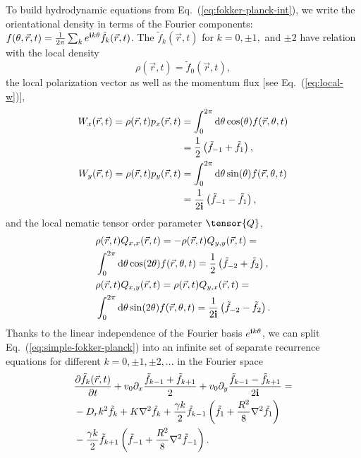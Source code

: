 \documentclass[reprint,floatfix,amsmath,amssymb,aps,pre,showkeys,showpacs,superscriptaddress]{revtex4-1}
\newcommand{\Dif}[2]{\frac{\partial #1}{\partial #2}}
\newcommand{\p}{p}
\newcommand{\im}{{\rm \bf i}}
\newcommand{\w}{W}
\newcommand{\dd}{{\rm d}}
\newcommand{\req}[1]{Eq.~(\ref{#1})}
\begin{document}
To build hydrodynamic equations from \req{eq:fokker-planck-int}, we write the orientational density in terms of the Fourier components: $f(\theta,\vec{r},t) = \frac{1}{2\pi} \sum_k e^{\im k\theta} \tilde{f}_k(\vec{r},t)$. The $\tilde{f}_k(\vec{r},t)$ for $k=0,\pm 1,$ and $\pm 2$ have relation with the local density 
\begin{equation}
\rho(\vec{r},t) = \tilde{f}_0(\vec{r},t),
\label{eq:f0}
\end{equation}
the local polarization vector as well as the momentum flux [see \req{eq:local-w}],
\begin{equation}
\begin{aligned}
\w_x(\vec{r},t) = \rho(\vec{r},t) \p_x(\vec{r},t) &= \int_0^{2\pi} \dd \theta \cos(\theta) f(\vec{r},\theta,t) \\ &= \frac{1}{2} \left( \tilde{f}_{-1} + \tilde{f}_{1} \right),\\
\w_y(\vec{r},t) = \rho(\vec{r},t) \p_y(\vec{r},t) &= \int_0^{2\pi} \dd \theta \sin(\theta) f(\vec{r},\theta,t) \\&= \frac{1}{2 \im} \left( \tilde{f}_{-1} - \tilde{f}_{1} \right),
\end{aligned}
\label{eq:f1}
\end{equation}
and the local nematic tensor order parameter $\tensor{Q}$,
\begin{equation}
\begin{aligned}
&\rho(\vec{r},t) Q_{x,x}(\vec{r},t) = - \rho(\vec{r},t) Q_{y,y}(\vec{r},t) = \\
&\int_0^{2\pi} \dd \theta \cos(2\theta) f(\vec{r},\theta,t) = \frac{1}{2} \left( \tilde{f}_{-2} + \tilde{f}_{2} \right), \\
&\rho(\vec{r},t) Q_{x,y}(\vec{r},t) = \rho(\vec{r},t) Q_{y,x}(\vec{r},t) = \\
&\int_0^{2\pi} \dd \theta \sin(2\theta) f(\vec{r},\theta,t) = \frac{1}{2\im} \left( \tilde{f}_{-2} - \tilde{f}_{2} \right).
\end{aligned}
\label{eq:f2}
\end{equation}
Thanks to the linear independence of the Fourier basis $e^{\im k \theta}$, we can split \req{eq:simple-fokker-planck} into an infinite set of separate recurrence equations for different $k=0, \pm 1, \pm 2, \dots$ in the Fourier space
\begin{equation}
\begin{aligned}
&\Dif{{\tilde{f}}_k (\vec{r},t)}{t} + v_0 \partial_x \frac{\tilde{f}_{k-1} + \tilde{f}_{k+1}}{2} + v_0 \partial_y \frac{\tilde{f}_{k-1} - \tilde{f}_{k+1}}{2\im} =\\
&-D_r k^2 \tilde{f}_k + K \nabla^2 \tilde{f}_k + \frac{\gamma k}{2} \tilde{f}_{k-1} \left( \tilde{f}_1 + \frac{R^2}{8} \nabla^2 \tilde{f}_1 \right) \\
&-\frac{\gamma k}{2} \tilde{f}_{k+1} \left(\tilde{f}_{-1} + \frac{R^2}{8} \nabla^2 \tilde{f}_{-1} \right). \\
\end{aligned}
\label{eq:fourier-fokker-planck}
\end{equation}
\end{document}
